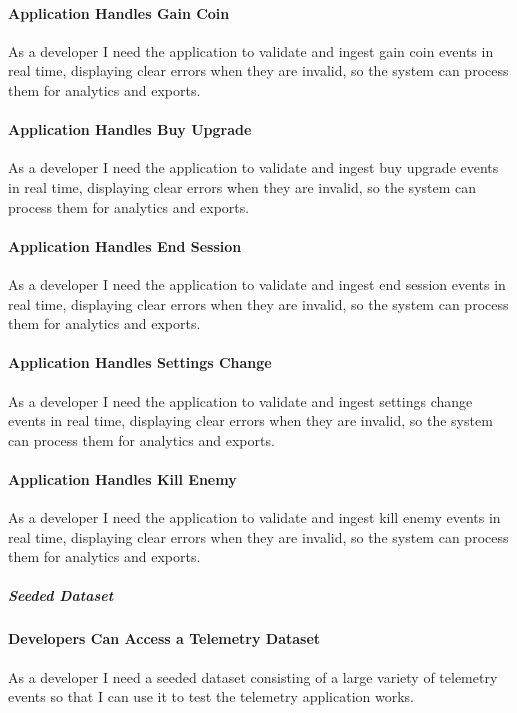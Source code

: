 \paragraph{Application Handles Gain Coin}
As a developer I need the application to validate and ingest gain coin events in real time, displaying clear errors when they are invalid, so the system can process them for analytics and exports.

\paragraph{Application Handles Buy Upgrade}
As a developer I need the application to validate and ingest buy upgrade events in real time, displaying clear errors when they are invalid, so the system can process them for analytics and exports.

\paragraph{Application Handles End Session}
As a developer I need the application to validate and ingest end session events in real time, displaying clear errors when they are invalid, so the system can process them for analytics and exports.

\paragraph{Application Handles Settings Change}
As a developer I need the application to validate and ingest settings change events in real time, displaying clear errors when they are invalid, so the system can process them for analytics and exports.

\paragraph{Application Handles Kill Enemy}
As a developer I need the application to validate and ingest kill enemy events in real time, displaying clear errors when they are invalid, so the system can process them for analytics and exports.

\subparagraph{Seeded Dataset}

\paragraph{Developers Can Access a Telemetry Dataset}
As a developer I need a seeded dataset consisting of a large variety of telemetry events so that I can use it to test the telemetry application works.

